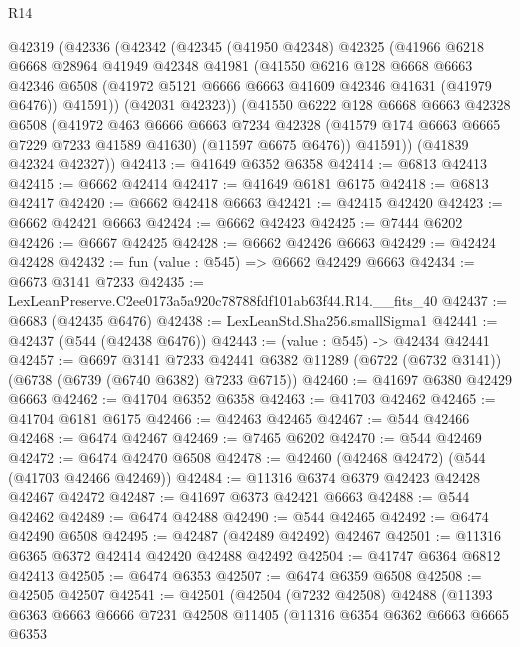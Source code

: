 \begin{lexlean}{R14}
\begin{coremodule}
  @42319
    (@42336
      (@42342
        (@42345
          (@41950 @42348)
          @42325
          (@41966
            @6218
            @6668
            @28964
            @41949
            @42348
            @41981
            (@41550
              @6216
              @128
              @6668
              @6663
              @42346
              @6508
              (@41972 @5121 @6666 @6663 @41609 @42346 @41631 (@41979 @6476))
              @41591))
          (@42031 @42323))
        (@41550
          @6222
          @128
          @6668
          @6663
          @42328
          @6508
          (@41972
            @463
            @6666
            @6663
            @7234
            @42328
            (@41579 @174 @6663 @6665 @7229 @7233 @41589 @41630)
            (@11597 @6675 @6476))
          @41591))
      (@41839 @42324 @42327))
@42413 := @41649 @6352 @6358
@42414 := @6813 @42413
@42415 := @6662 @42414
@42417 := @41649 @6181 @6175
@42418 := @6813 @42417
@42420 := @6662 @42418 @6663
@42421 := @42415 @42420
@42423 := @6662 @42421 @6663
@42424 := @6662 @42423
@42425 := @7444 @6202
@42426 := @6667 @42425
@42428 := @6662 @42426 @6663
@42429 := @42424 @42428
@42432 := fun (value : @545) => @6662 @42429 @6663
@42434 := @6673 @3141 @7233
@42435 := LexLeanPreserve.C2ee0173a5a920c78788fdf101ab63f44.R14.__fits_40
@42437 := @6683 (@42435 @6476)
@42438 := LexLeanStd.Sha256.smallSigma1
@42441 := @42437 (@544 (@42438 @6476))
@42443 := (value : @545) -> @42434 @42441
@42457 := @6697
    @3141
    @7233
    @42441
    @6382
    @11289
    (@6722 (@6732 @3141))
    (@6738 (@6739 (@6740 @6382) @7233 @6715))
@42460 := @41697 @6380 @42429 @6663
@42462 := @41704 @6352 @6358
@42463 := @41703 @42462
@42465 := @41704 @6181 @6175
@42466 := @42463 @42465
@42467 := @544 @42466
@42468 := @6474 @42467
@42469 := @7465 @6202
@42470 := @544 @42469
@42472 := @6474 @42470 @6508
@42478 := @42460 (@42468 @42472) (@544 (@41703 @42466 @42469))
@42484 := @11316 @6374 @6379 @42423 @42428 @42467 @42472
@42487 := @41697 @6373 @42421 @6663
@42488 := @544 @42462
@42489 := @6474 @42488
@42490 := @544 @42465
@42492 := @6474 @42490 @6508
@42495 := @42487 (@42489 @42492) @42467
@42501 := @11316 @6365 @6372 @42414 @42420 @42488 @42492
@42504 := @41747 @6364 @6812 @42413
@42505 := @6474 @6353
@42507 := @6474 @6359 @6508
@42508 := @42505 @42507
@42541 := @42501
    (@42504
      (@7232 @42508)
      @42488
      (@11393
        @6363
        @6663
        @6666
        @7231
        @42508
        @11405
        (@11316
          @6354
          @6362
          @6663
          @6665
          @6353

\end{coremodule}
\end{lexlean}
